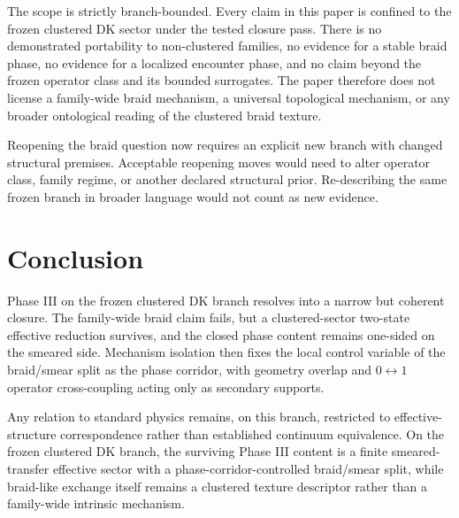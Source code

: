 \documentclass[11pt]{article}
\begin{document}
The scope is strictly branch-bounded. Every claim in this paper is confined to the frozen clustered DK sector under the tested closure pass. There is no demonstrated portability to non-clustered families, no evidence for a stable braid phase, no evidence for a localized encounter phase, and no claim beyond the frozen operator class and its bounded surrogates. The paper therefore does not license a family-wide braid mechanism, a universal topological mechanism, or any broader ontological reading of the clustered braid texture.

Reopening the braid question now requires an explicit new branch with changed structural premises. Acceptable reopening moves would need to alter operator class, family regime, or another declared structural prior. Re-describing the same frozen branch in broader language would not count as new evidence.

\section{Conclusion}

Phase III on the frozen clustered DK branch resolves into a narrow but coherent closure. The family-wide braid claim fails, but a clustered-sector two-state effective reduction survives, and the closed phase content remains one-sided on the smeared side. Mechanism isolation then fixes the local control variable of the braid/smear split as the phase corridor, with geometry overlap and $0 \leftrightarrow 1$ operator cross-coupling acting only as secondary supports.

Any relation to standard physics remains, on this branch, restricted to effective-structure correspondence rather than established continuum equivalence. On the frozen clustered DK branch, the surviving Phase III content is a finite smeared-transfer effective sector with a phase-corridor-controlled braid/smear split, while braid-like exchange itself remains a clustered texture descriptor rather than a family-wide intrinsic mechanism.
\end{document}
